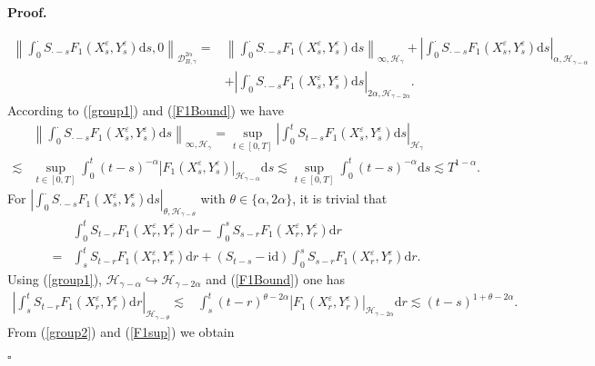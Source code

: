 \documentclass[10pt,a4paper]{article}
\numberwithin{equation}{section}
\newenvironment{proof}[1][\normalfont\bfseries Proof]{%
	\noindent #1.\hspace{0.5em}%
	\ignorespaces%
}{%
	\hfill $\square$%
	\par%
}
\begin{document}
\begin{proof}
\begin{align*}
			\left\|\int_0^\cdot S_{\cdot-s} F_1(X_s^\varepsilon,Y_s^\varepsilon) \mathrm{d} s, 0 \right\|_{\mathcal{D}_{B,\gamma}^{2\alpha}}
			=&\left\|\int_0^\cdot S_{\cdot-s} F_1(X_s^\varepsilon,Y_s^\varepsilon) \mathrm{d} s \right\|_{\infty,\mathcal H_\gamma}
			+\left|\int_0^\cdot S_{\cdot-s} F_1(X_s^\varepsilon,Y_s^\varepsilon) \mathrm{d} s \right|_{\alpha,\mathcal H_{\gamma-\alpha}} \nonumber \\
			&+ \left|\int_0^\cdot S_{\cdot-s} F_1(X_s^\varepsilon,Y_s^\varepsilon) \mathrm{d} s  \right|_{2\alpha,\mathcal H_{\gamma-2\alpha}}.
		\end{align*}
		According to (\ref{group1}) and (\ref{F1Bound}) we have
		\begin{align}\label{F1sup}
			&\left\|\int_0^\cdot S_{\cdot-s} F_1(X_s^\varepsilon,Y_s^\varepsilon) \mathrm{d} s \right\|_{\infty,\mathcal H_\gamma}
			=\sup_{t\in [0,T]} \left| \int_0^t S_{t-s} F_1(X_s^\varepsilon,Y_s^\varepsilon)  \mathrm{d} s \right|_{\mathcal H_\gamma} \nonumber\\
			\lesssim & \sup_{t\in [0,T]} \int_0^t (t-s)^{-\alpha} |F_1(X_s^\varepsilon,Y_s^\varepsilon)|_{\mathcal H_{\gamma-\alpha}}  \mathrm{d} s
			\lesssim  \sup_{t\in [0,T]} \int_0^t  (t-s)^{-\alpha}  \mathrm{d} s
			\lesssim  T^{1-\alpha} .
		\end{align}
		For $\left| \int_0^\cdot S_{\cdot-s} F_1(X_s^\varepsilon,Y_s^\varepsilon) \mathrm{d} s \right|_{\theta,\mathcal H_{\gamma-\theta}}$ with $\theta \in \{\alpha, 2\alpha\}$, it is trivial that
		\begin{align*}
			&\int_0^t S_{t-r} F_1(X_r^\varepsilon,Y_r^\varepsilon)\mathrm{d} r-\int_0^s S_{s-r} F_1(X_r^\varepsilon,Y_r^\varepsilon)\mathrm{d} r \\
			=&\int_s^t S_{t-r} F_1(X_r^\varepsilon,Y_r^\varepsilon)\mathrm{d} r
			+(S_{t-s}-\mathrm{id} ) \int_0^s S_{s-r} F_1(X_r^\varepsilon,Y_r^\varepsilon)\mathrm{d} r.
		\end{align*}	
		Using (\ref{group1}), $\mathcal H_{\gamma-\alpha} \hookrightarrow \mathcal H_{\gamma-2\alpha}$ and (\ref{F1Bound}) one has
		\begin{align}\label{F1alp}
			\left|\int_s^t S_{t-r} F_1(X_r^\varepsilon,Y_r^\varepsilon)\mathrm{d} r \right|_{\mathcal H_{\gamma-\theta}}
			\lesssim &\int_s^t (t-r)^{\theta-2\alpha} |F_1(X_r^\varepsilon,Y_r^\varepsilon)|_{\mathcal H_{\gamma-2\alpha}} \mathrm{d} r
			\lesssim (t-s)^{1+\theta-2\alpha}.
		\end{align}
		From (\ref{group2}) and (\ref{F1sup}) we obtain
		\begin{align}\label{F12alp}

\end{align}
\end{proof}
\end{document}
